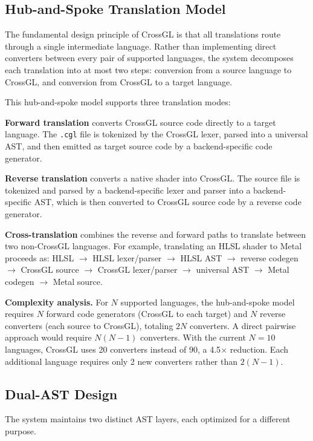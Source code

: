 \documentclass{svproc}
\begin{document}
\subsection{Hub-and-Spoke Translation Model}

The fundamental design principle of CrossGL is that all translations route through a single intermediate language. Rather than implementing direct converters between every pair of supported languages, the system decomposes each translation into at most two steps: conversion from a source language to CrossGL, and conversion from CrossGL to a target language.

This hub-and-spoke model supports three translation modes:

\textbf{Forward translation} converts CrossGL source code directly to a target language. The \texttt{.cgl} file is tokenized by the CrossGL lexer, parsed into a universal AST, and then emitted as target source code by a backend-specific code generator.

\textbf{Reverse translation} converts a native shader into CrossGL. The source file is tokenized and parsed by a backend-specific lexer and parser into a backend-specific AST, which is then converted to CrossGL source code by a reverse code generator.

\textbf{Cross-translation} combines the reverse and forward paths to translate between two non-CrossGL languages. For example, translating an HLSL shader to Metal proceeds as: HLSL $\rightarrow$ HLSL lexer/parser $\rightarrow$ HLSL AST $\rightarrow$ reverse codegen $\rightarrow$ CrossGL source $\rightarrow$ CrossGL lexer/parser $\rightarrow$ universal AST $\rightarrow$ Metal codegen $\rightarrow$ Metal source.

\textbf{Complexity analysis.} For $N$ supported languages, the hub-and-spoke model requires $N$ forward code generators (CrossGL to each target) and $N$ reverse converters (each source to CrossGL), totaling $2N$ converters. A direct pairwise approach would require $N(N-1)$ converters. With the current $N=10$ languages, CrossGL uses 20 converters instead of 90, a 4.5$\times$ reduction. Each additional language requires only 2 new converters rather than $2(N-1)$.

\subsection{Dual-AST Design}

The system maintains two distinct AST layers, each optimized for a different purpose.
\end{document}
